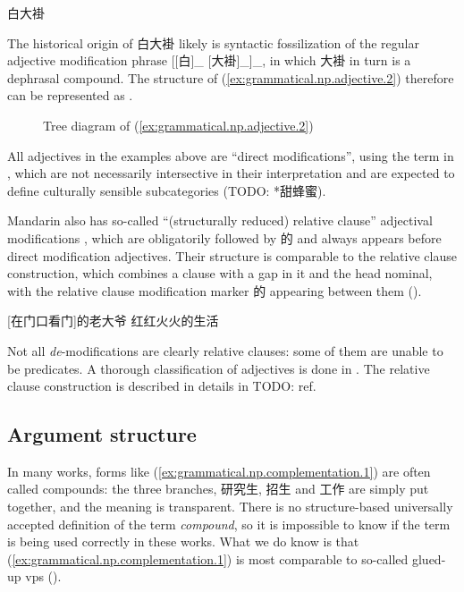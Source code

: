 \documentclass[UTF8, a4paper, oneside, scheme=plain, 12pt]{ctexrep}
\newcommand*{\citepages}[1]{pp.~{#1}}
\newcommand*{\term}[1]{\emph{#1}}
\newcommand{\form}[1]{\emph{#1}}
\begin{document}
\begin{exe}
    \ex\label{ex:grammatical.np.adjective.2} 白大褂
\end{exe}

The historical origin of 白大褂 likely is syntactic fossilization
of the regular adjective modification phrase [[白]_{} [大褂]_{}]_{},
in which 大褂 in turn is a dephrasal compound.
The structure of (\ref{ex:grammatical.np.adjective.2})
therefore can be represented as .

\begin{figure}[H]
    \centering
    {
        \centering
        
    }
    \caption{Tree diagram of (\ref{ex:grammatical.np.adjective.2})}
    \label{fig:grammatical.np.adjective.2}
\end{figure}

All adjectives in the examples above are ``direct modifications'',
using the term in \citet{cinque2010syntax},
which are not necessarily intersective in their interpretation
and are expected to define culturally sensible subcategories
(TODO: *甜蜂蜜).

Mandarin also has so-called ``(structurally reduced) relative clause'' adjectival modifications
\citep[\citepages{25-28}]{cinque2010syntax},
which are obligatorily followed by 的 and always appears before direct modification adjectives.
Their structure is comparable to the relative clause construction,
which combines a clause with a gap in it and the head nominal,
with the relative clause modification marker 的 appearing between them
().

\begin{exe}
    \ex\label{ex:grammatical.np.adjective.3}
    [在门口看门]的老大爷
    \ex 红红火火的生活
\end{exe}

Not all \form{de}-modifications are clearly relative clauses:
some of them are unable to be predicates.
A thorough classification of adjectives is done in .
The relative clause construction is described in details in TODO: ref.

\subsection{Argument structure}\label{sec:grammatical.np.complementation}

In many works, forms like (\ref{ex:grammatical.np.complementation.1}) are often called compounds:
the three branches, 研究生, 招生 and 工作 are simply put together,
and the meaning is transparent.
There is no structure-based universally accepted definition of the term \term{compound},
so it is impossible to know if the term is being used correctly in these works.
What we do know is that (\ref{ex:grammatical.np.complementation.1})
is most comparable to so-called glued-up \acp{vp} ().
\end{document}

